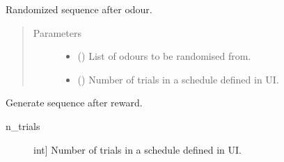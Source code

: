\documentclass[letterpaper,10pt,english]{sphinxmanual}
\begin{document}
\begin{fulllineitems}
\label{\detokenize{NoSeMazeSchedule/Generation:Generation.Gen.odor_sequence}}
\pysigstartsignatures
{}
\pysigstopsignatures
\sphinxAtStartPar
Randomized sequence after odour.
\begin{quote}\begin{description}
\item[{Parameters}] \leavevmode\begin{itemize}
\item {} 
\sphinxAtStartPar
{} () \textendash{} List of odours to be randomised from.

\item {} 
\sphinxAtStartPar
{} () \textendash{} Number of trials in a schedule defined in UI.

\end{itemize}

\end{description}\end{quote}

\end{fulllineitems}


\begin{fulllineitems}
\label{\detokenize{NoSeMazeSchedule/Generation:Generation.Gen.reward_sequence}}
\pysigstartsignatures
{}
\pysigstopsignatures
\sphinxAtStartPar
Generate sequence after reward.
\begin{description}
\item[{n\_trials}] \leavevmode{[}int{]}
\sphinxAtStartPar
Number of trials in a schedule defined in UI.

\end{description}

\end{fulllineitems}


\sphinxstepscope
\end{document}
